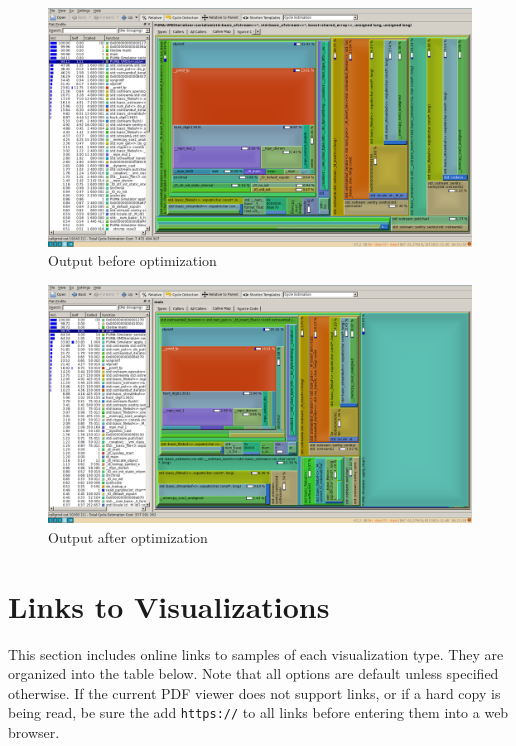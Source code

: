 \documentclass[a4paper,11pt]{article}
\begin{document}
\begin{appendices}
\begin{figure}[H]
\includegraphics[width=\textwidth]{before_opti.png}
\caption{Output before optimization}
\label{fig:before}
\end{figure}
\vspace{-0.5cm}
\begin{figure}[H]
\includegraphics[width=\textwidth]{after_opti.png}
\caption{Output after optimization}
\label{fig:after}
\end{figure}

\newpage
\section{Links to Visualizations}\label{links}

This section includes online links to samples of each visualization type.  They are organized into the table below.  Note that all options are default unless specified otherwise.  If the current PDF viewer does not support links, or if a hard copy is being read, be sure the add \texttt{https://} to all links before entering them into a web browser.


\end{appendices}
\end{document}
